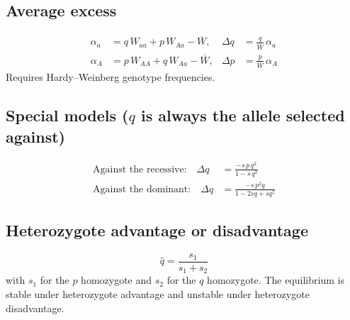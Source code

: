 \documentclass[11pt]{article}
\begin{document}
\subsection*{Average excess}
\begin{align*}
  \alpha_a &= q\,W_{aa} + p\,W_{Aa} - \overline{W}, & \Delta q &= \frac{q}{\overline{W}}\,\alpha_a\\[4pt]
  \alpha_A &= p\,W_{AA} + q\,W_{Aa} - \overline{W}, & \Delta p &= \frac{p}{\overline{W}}\,\alpha_A
\end{align*}
Requires Hardy--Weinberg genotype frequencies.

\subsection*{Special models (\(q\) is always the allele selected against)}
\begin{align*}
  \text{Against the recessive:}\quad \Delta q &= \frac{-s\,p\,q^2}{1 - s\,q^2}\\[4pt]
  \text{Against the dominant:}\quad \Delta q &= \frac{-s\,p^2 q}{1 - 2sq + sq^2}
\end{align*}

\subsection*{Heterozygote advantage or disadvantage}
\[
  \hat{q} = \frac{s_1}{s_1 + s_2}
\]
with \(s_1\) for the \(p\) homozygote and \(s_2\) for the \(q\) homozygote. The equilibrium is stable under heterozygote advantage and unstable under heterozygote disadvantage.

\label{LastPage}
\end{document}
